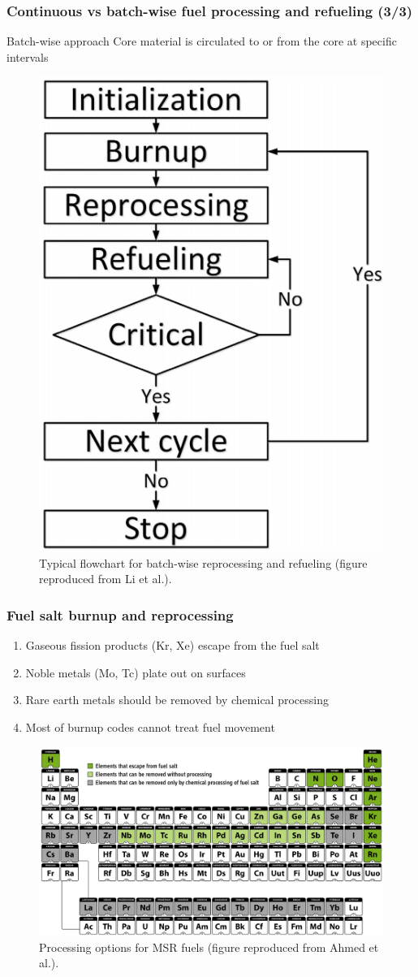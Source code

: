 \begin{frame}
\frametitle{Continuous vs batch-wise fuel processing and refueling (3/3)}
	\begin{block}{Batch-wise approach}
		Core material is circulated to or from the core at specific intervals		
	\end{block}
           \begin{figure}[t]
	\includegraphics[height=0.45\textwidth]{./images/batch-wise.png}
	\caption{Typical flowchart for batch-wise reprocessing and refueling (figure reproduced from Li et al.\cite{li_optimization_2018}).}
			\end{figure}               
\end{frame}


\begin{frame}
  \frametitle{Fuel salt burnup and reprocessing}
                  \vspace*{-0.05in}
               \begin{enumerate}
               	\item Gaseous fission products (Kr, Xe) escape from the fuel salt
               	\item Noble metals (Mo, Tc) plate out on surfaces
               	\item Rare earth metals should be removed by chemical processing
                \item Most of burnup codes cannot treat fuel movement
               \end{enumerate}

           \begin{figure}[t]
			\hspace*{-0.2in}
                \includegraphics[height=0.48\textwidth]{../figures/periodic_map.png}
		\vspace*{-0.05in}
		\caption{Processing options for MSR fuels (figure reproduced from Ahmed et al.\cite{ahmad_neutronics_2015}).}
     	 \end{figure}               
\end{frame}

